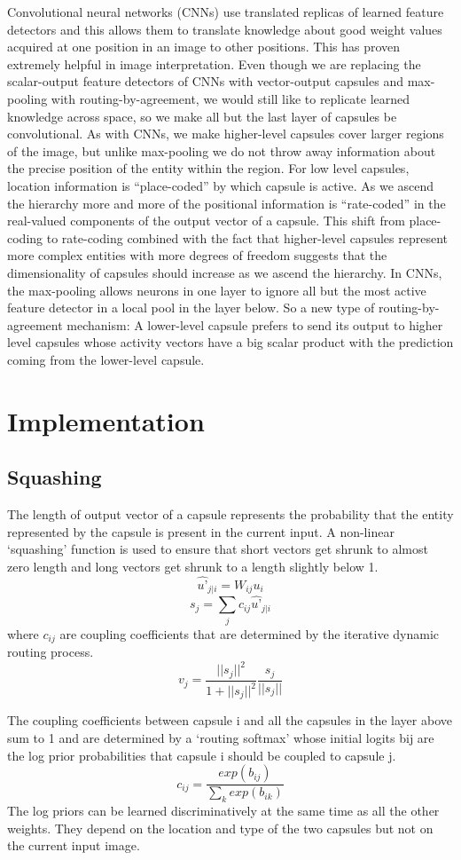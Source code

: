 \documentclass[10pt,twocolumn,letterpaper]{article}
\begin{document}
Convolutional neural networks (CNNs) use translated replicas of learned feature detectors and this allows them to translate knowledge about good weight values acquired at one position in an image to other positions. This has proven extremely helpful in image interpretation. Even though we are replacing the scalar-output feature detectors of CNNs with vector-output capsules and max-pooling with routing-by-agreement, we would still like to replicate learned knowledge across space, so we make all but the last layer of capsules be convolutional. As with CNNs, we make higher-level capsules cover larger regions of the image, but unlike max-pooling we do not throw away information about the precise position of the entity within the region. For low level capsules, location information is “place-coded” by which capsule is active. As we ascend the hierarchy more and more of the positional information is “rate-coded” in the real-valued components of the output vector of a capsule. This shift from place-coding to rate-coding combined with the fact that higher-level capsules represent more complex entities with more degrees of freedom suggests that the dimensionality of capsules should increase as we ascend the hierarchy.
In CNNs, the max-pooling allows neurons in one layer to ignore all but the most active feature detector in a local pool in the layer below. So a new type of routing-by-agreement mechanism: A lower-level capsule prefers to send its output to higher level capsules whose activity vectors have a big scalar product with the prediction coming from the lower-level capsule.

\section{Implementation}
\subsection{Squashing}
The length of output vector of a capsule represents the probability that the entity represented by the capsule is present in the current input. A non-linear `squashing' function is used to ensure that short vectors get shrunk to almost zero length and long vectors get shrunk to a length slightly below 1.
\[ \hat{u’}_{j|i} = W_{ij}u_i \]
\[ s_j = \sum_j c_{ij} \hat{u’}_{j|i} \]
 where $c_{ij}$ are coupling coefficients that are determined by the iterative dynamic routing process.
\[ v_j = \frac{||s_j||^2}{1+||s_j||^2}\frac{s_j}{||s_j||}\]

The coupling coefficients between capsule i and all the capsules in the layer above sum to 1 and are determined by a `routing softmax' whose initial logits bij are the log prior probabilities that capsule i should be coupled to capsule j.
\[ c_{ij} = \frac{exp(b_{ij})}{\sum_k exp(b_{ik})} \]
The log priors can be learned discriminatively at the same time as all the other weights. They depend on the location and type of the two capsules but not on the current input image.
\end{document}
